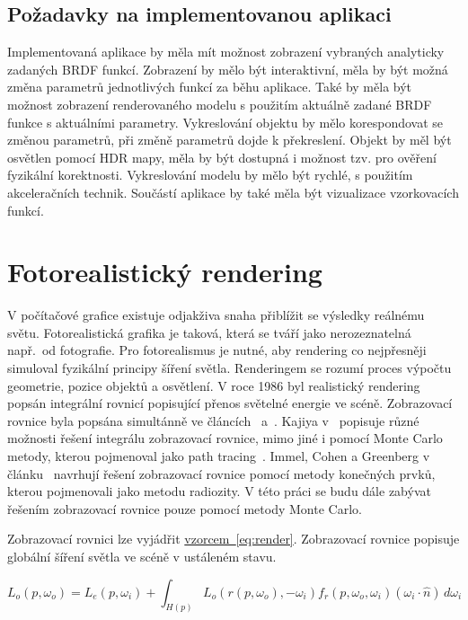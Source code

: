 \documentclass[czech,master]{diploma}
\newcommand{\uvec}[1]{\hat{#1}}
\newcommand{\point}{p}
\newcommand{\brdf}{f_r\left(\point,\omega_{o},\omega_{i}\right)}
\newcommand{\normVec}{\uvec{n}}
\newcommand{\inVec}{\omega_{i}}
\newcommand{\outVec}{\omega_{o}}
\newcommand{\outRadiance}{L_o\left(\point,\outVec\right)}
\newcommand{\emitRadiance}{L_e\left(\point,\inVec\right)}
\newcommand{\rt}{r\left(\point,\outVec\right)}
\newcommand{\radiancert}{L_o\left(\rt,-\inVec\right)}
\newcommand{\inDotNorm}{\left(\inVec\cdot\normVec\right)}
\begin{document}
\section{Požadavky na implementovanou aplikaci}
Implementovaná aplikace by měla mít možnost zobrazení vybraných analyticky zadaných BRDF funkcí. Zobrazení by mělo být interaktivní, měla by být možná změna parametrů jednotlivých funkcí za běhu aplikace. Také by měla být možnost zobrazení renderovaného modelu s použitím aktuálně zadané BRDF funkce s aktuálními parametry. Vykreslování objektu by mělo korespondovat se změnou parametrů, při změně parametrů dojde k překreslení. Objekt by měl být osvětlen pomocí HDR mapy, měla by být dostupná i možnost tzv.  pro ověření fyzikální korektnosti. Vykreslování modelu by mělo být rychlé, s použitím akceleračních technik. Součástí aplikace by také měla být vizualizace vzorkovacích funkcí.

\clearpage
\chapter{Fotorealistický rendering}
V počítačové grafice existuje odjakživa snaha přiblížit se výsledky reálnému světu. Fotorealistická grafika je taková, která se tváří jako nerozeznatelná např.\ od fotografie. Pro fotorealismus je nutné, aby rendering co nejpřesněji simuloval fyzikální principy šíření světla. Renderingem se rozumí proces výpočtu geometrie, pozice objektů a osvětlení. V roce 1986 byl realistický rendering popsán integrální rovnicí popisující přenos světelné energie ve scéně. Zobrazovací rovnice byla popsána simultánně ve článcích~\cite{KajiyaRenderEq} a~\cite{ImmelRenderEq}. Kajiya v~\cite{KajiyaRenderEq} popisuje různé možnosti řešení integrálu zobrazovací rovnice, mimo jiné i pomocí Monte Carlo metody, kterou pojmenoval jako path tracing~\cite{HainesRayTracingGems2019}. Immel, Cohen a Greenberg v článku~\cite{ImmelRenderEq} navrhují řešení zobrazovací rovnice pomocí metody konečných prvků, kterou pojmenovali jako metodu radiozity. V této práci se budu dále zabývat řešením zobrazovací rovnice pouze pomocí metody Monte Carlo.\par
Zobrazovací rovnici lze vyjádřit \hyperref[eq:render]{vzorcem~\ref{eq:render}}. Zobrazovací rovnice popisuje globální šíření světla ve scéně v ustáleném stavu.

\begin{equation} \label{eq:render}
  \outRadiance = \emitRadiance + \int_{H \left( \point \right)}^{~}\radiancert \brdf \inDotNorm \,d\inVec
\end{equation}
\end{document}
